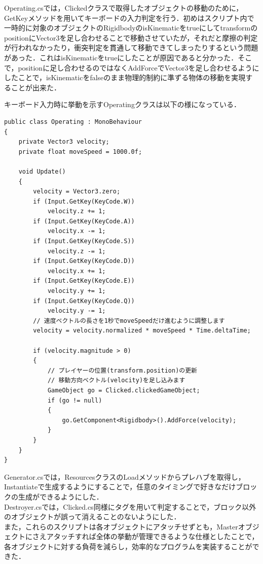 \documentclass[uplatex,12pt]{jsarticle}
\begin{document}
Operating.csでは，Clickedクラスで取得したオブジェクトの移動のために，GetKeyメソッドを用いてキーボードの入力判定を行う．初めはスクリプト内で一時的に対象のオブジェクトのRigidbodyのisKinematicをtrueにしてtransformのpositionにVector3を足し合わせることで移動させていたが，それだと摩擦の判定が行われなかったり，衝突判定を貫通して移動できてしまったりするという問題があった．これはisKinematicをtrueにしたことが原因であると分かった．そこで，positionに足し合わせるのではなくAddForceでVector3を足し合わせるようにしたことで，isKinematicをfalseのまま物理的制約に準ずる物体の移動を実現することが出来た．

キーボード入力時に挙動を示すOperatingクラスは以下の様になっている．

\begin{lstlisting}[caption=Operatingクラス, label=operating]
public class Operating : MonoBehaviour
{
    private Vector3 velocity;
    private float moveSpeed = 1000.0f;

    void Update()
    {
        velocity = Vector3.zero;
        if (Input.GetKey(KeyCode.W))
            velocity.z += 1;
        if (Input.GetKey(KeyCode.A))
            velocity.x -= 1;
        if (Input.GetKey(KeyCode.S))
            velocity.z -= 1;
        if (Input.GetKey(KeyCode.D))
            velocity.x += 1;
        if (Input.GetKey(KeyCode.E))
            velocity.y += 1;
        if (Input.GetKey(KeyCode.Q))
            velocity.y -= 1;
        // 速度ベクトルの長さを1秒でmoveSpeedだけ進むように調整します
        velocity = velocity.normalized * moveSpeed * Time.deltaTime;

        if (velocity.magnitude > 0)
        {
            // プレイヤーの位置(transform.position)の更新
            // 移動方向ベクトル(velocity)を足し込みます
            GameObject go = Clicked.clickedGameObject;
            if (go != null)
            {
                go.GetComponent<Rigidbody>().AddForce(velocity);
            }
        }
    }
}
\end{lstlisting}

Generator.csでは，ResourcesクラスのLoadメソッドからプレハブを取得し，Instantiateで生成するようにすることで，任意のタイミングで好きなだけブロックの生成ができるようにした． \\

Destroyer.csでは，Clicked.cs同様にタグを用いて判定することで，ブロック以外のオブジェクトが誤って消えることのないようにした． \\

また，これらのスクリプトは各オブジェクトにアタッチせずとも，Masterオブジェクトにさえアタッチすれば全体の挙動が管理できるような仕様としたことで，各オブジェクトに対する負荷を減らし，効率的なプログラムを実装することができた．
\end{document}
